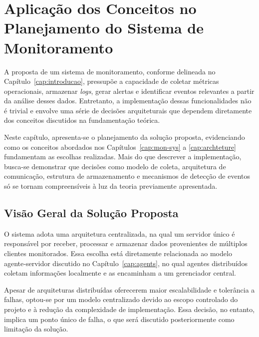 \documentclass[
    12pt
    ,oneside
    ,a4paper
    ,chapter=TITLE
    ,section=TITLE
    ,sumario=abnt-6027-2012]{abntex2}
\begin{document}

\chapter{Aplicação dos Conceitos no Planejamento do Sistema de Monitoramento}
\label{cap:plan}

A proposta de um sistema de monitoramento, conforme delineada no Capítulo~\ref{cap:introducao}, pressupõe a capacidade de coletar métricas operacionais, armazenar \textit{logs}, gerar alertas e identificar eventos relevantes a partir da análise desses dados. Entretanto, a implementação dessas funcionalidades não é trivial e envolve uma série de decisões arquiteturais que dependem diretamente dos conceitos discutidos na fundamentação teórica.

Neste capítulo, apresenta-se o planejamento da solução proposta, evidenciando como os conceitos abordados nos Capítulos~\ref{cap:mon-sys} a \ref{cap:archteture} fundamentam as escolhas realizadas. Mais do que descrever a implementação, busca-se demonstrar que decisões como modelo de coleta, arquitetura de comunicação, estrutura de armazenamento e mecanismos de detecção de eventos só se tornam compreensíveis à luz da teoria previamente apresentada.

\section{Visão Geral da Solução Proposta}

O sistema adota uma arquitetura centralizada, na qual um servidor único é responsável por receber, processar e armazenar dados provenientes de múltiplos clientes monitorados. Essa escolha está diretamente relacionada ao modelo agente‑servidor discutido no Capítulo~\ref{cap:agents}, no qual agentes distribuídos coletam informações localmente e as encaminham a um gerenciador central.

Apesar de arquiteturas distribuídas oferecerem maior escalabilidade e tolerância a falhas, optou-se por um modelo centralizado devido ao escopo controlado do projeto e à redução da complexidade de implementação. Essa decisão, no entanto, implica um ponto único de falha, o que será discutido posteriormente como limitação da solução.
\end{document}
